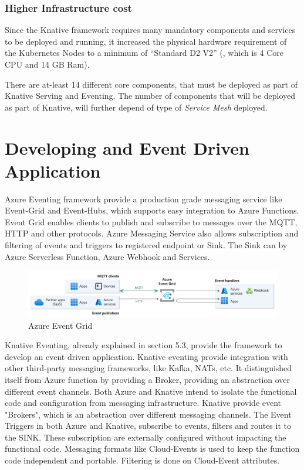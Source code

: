 \documentclass{article}
\begin{document}
\begin{flushleft}
\subsubsection{Higher Infrastructure cost}
Since the Knative framework requires many mandatory components and services to be deployed and running, it increased the physical hardware requirement of the Kubernetes Nodes to a minimum of “Standard D2 V2” (, which is 4 Core CPU and 14 GB Ram). 
\par
There are at-least 14 different core components, that must be deployed as part of Knative Serving and Eventing. The number of components that will be deployed as part of Knative, will further depend of type of \textit{Service Mesh} deployed. 
\end{flushleft}
\pagebreak
\section{Developing and Event Driven Application}
\begin{flushleft}
Azure Eventing framework provide a production grade messaging service like Event-Grid and Event-Hubs, which supports easy integration to Azure Functions. Event Grid enables clients to publish and subscribe to messages over the MQTT, HTTP and other protocols. Azure Messaging Service also allows subscription and filtering of events and triggers to registered endpoint or Sink. The Sink can by Azure Serverless Function, Azure Webhook and Services. 
\begin{figure}[h]
    \centering
    \includegraphics[width=1.00\linewidth]{images/general-event-grid.png}
    \caption{Azure Event Grid}
\end{figure}
 
\par
Knative Eventing, already explained in section 5.3, provide the framework to develop an event driven application. Knative eventing provide integration with other third-party messaging frameworks, like Kafka, NATs, etc. It distinguished itself from Azure function by providing a Broker, providing an abstraction over different event channels. 
\hfill\break
Both Azure and Knative intend to isolate the functional code and configuration from messaging infrastructure. Knative provide event "Brokers", which is an abstraction over different messaging channels. 
\hfill\break
The Event Triggers in both Azure and Knative, subscribe to events, filters and routes it to the SINK. These subscription are externally configured without impacting the functional code. Messaging formats like Cloud-Events is used to keep the function code independent and portable. Filtering is done on Cloud-Event attributes. 
\end{flushleft}
\pagebreak
\end{document}
